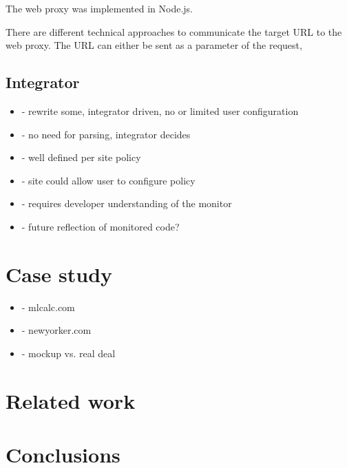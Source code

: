 \documentclass{llncs}
\begin{document}
The web proxy was implemented in Node.js. 

There are different technical approaches to communicate the target URL to the web 
proxy. The URL can either be sent as a parameter of the request, 

\subsection{Integrator}

\begin{itemize}
\item- rewrite some, integrator driven, no or limited user configuration
\item- no need for parsing, integrator decides
\item- well defined per site policy
\item- site could allow user to configure policy
\item- requires developer understanding of the monitor
\item- future reflection of monitored code?
\end{itemize}


\section{Case study}
\label{sec:case}

\begin{itemize}
\item- mlcalc.com
\item- newyorker.com
\item- mockup vs. real deal
\end{itemize}

\section{Related work}
\label{sec:related}

\section{Conclusions}
\label{sec:conc}



\end{document}
